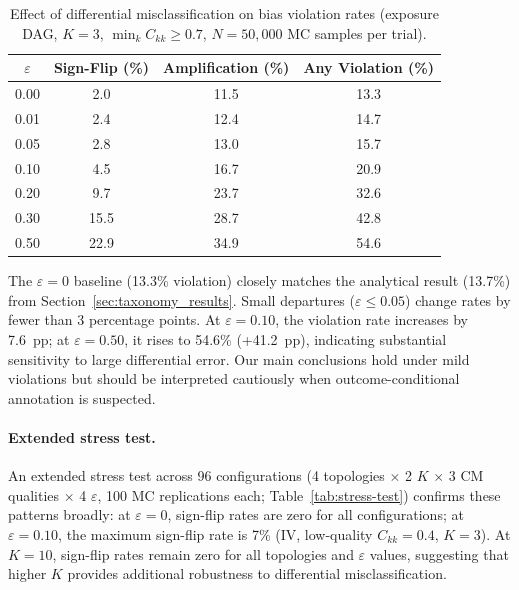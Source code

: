 \begin{table}[h]
\centering
\small
\caption{Effect of differential misclassification on bias violation rates (exposure DAG, $K{=}3$, $\min_k C_{kk} \geq 0.7$, $N{=}50{,}000$ MC samples per trial).}
\label{tab:nondiff_stress}
\begin{tabular}{cccc}
\toprule
$\varepsilon$ & Sign-Flip (\%) & Amplification (\%) & Any Violation (\%) \\
\midrule
0.00 & 2.0 & 11.5 & 13.3 \\
0.01 & 2.4 & 12.4 & 14.7 \\
0.05 & 2.8 & 13.0 & 15.7 \\
0.10 & 4.5 & 16.7 & 20.9 \\
0.20 & 9.7 & 23.7 & 32.6 \\
0.30 & 15.5 & 28.7 & 42.8 \\
0.50 & 22.9 & 34.9 & 54.6 \\
\bottomrule
\end{tabular}
\end{table}

The $\varepsilon{=}0$ baseline (13.3\% violation) closely matches the analytical result (13.7\%) from Section~\ref{sec:taxonomy_results}. Small departures ($\varepsilon \leq 0.05$) change rates by fewer than 3 percentage points. At $\varepsilon{=}0.10$, the violation rate increases by 7.6~pp; at $\varepsilon{=}0.50$, it rises to 54.6\% (+41.2~pp), indicating substantial sensitivity to large differential error. Our main conclusions hold under mild violations but should be interpreted cautiously when outcome-conditional annotation is suspected.

\paragraph{Extended stress test.}
An extended stress test across 96 configurations (4 topologies $\times$ 2 $K$ $\times$ 3 CM qualities $\times$ 4 $\varepsilon$, 100 MC replications each; Table~\ref{tab:stress-test}) confirms these patterns broadly: at $\varepsilon{=}0$, sign-flip rates are zero for all configurations; at $\varepsilon{=}0.10$, the maximum sign-flip rate is 7\% (IV, low-quality $C_{kk}{=}0.4$, $K{=}3$). At $K{=}10$, sign-flip rates remain zero for all topologies and $\varepsilon$ values, suggesting that higher $K$ provides additional robustness to differential misclassification.




